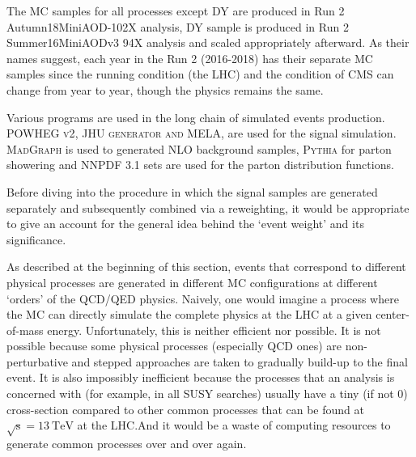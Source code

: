 The MC samples for all processes except DY are produced in Run 2 Autumn18MiniAOD-102X analysis,
DY sample is produced in Run 2 Summer16MiniAODv3 94X analysis and scaled appropriately afterward. As their names
suggest, each year in the Run 2 (2016-2018) has their separate MC samples since the running condition
(the LHC) and the condition of CMS can change from year to year, though the physics remains the same.

Various programs are used in the long chain of simulated events production.
\textsc{POWHEG v2}\xspace\cite{powhegv2}, \textsc{JHU generator and MELA}\xspace\cite{jhugen}, are used for 
the signal simulation.
\textsc{MadGraph}\xspace\cite{madgraph} is used to generated NLO background samples, 
\textsc{Pythia}\xspace\cite{pythia} for parton
showering and \textsc{NNPDF} 3.1\cite{nnpdf} sets are used for the parton distribution functions.

Before diving into the procedure in which the signal samples are generated separately and
subsequently combined via a reweighting, it would be appropriate to give
an account for the general idea behind the `event weight' and its significance.

As described at the beginning of this section, events that correspond to different physical
processes are generated in different MC configurations at different `orders' of the QCD/QED physics.
Naively, one would imagine a process where the MC can directly simulate the complete physics at
the LHC at a given center-of-mass energy. Unfortunately, this is neither efficient nor possible.
It is not possible because some physical processes (especially QCD ones) are non-perturbative and
stepped approaches are taken to gradually build-up to the final event.
It is also impossibly inefficient because the processes that an analysis is concerned with 
(for example, in all SUSY searches) usually have a tiny (if not 0)
cross-section compared to other common processes that can be
found at
$\sqrt{\mathrm{s}} = \SI{13}{\tera\electronvolt}$ at the LHC.\@ And it would be a waste of
computing resources to generate common processes over and over again.

